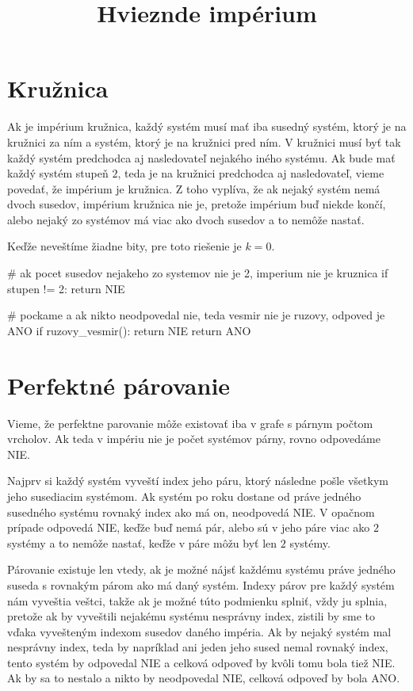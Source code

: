\documentclass[10pt]{article}
\title{\vspace{-3cm}Hvieznde impérium}
\begin{document}
\author{}
\date{}
\maketitle

\section*{Kružnica}

Ak je impérium kružnica, každý systém musí mať iba susedný systém, ktorý je na
kružnici za ním a systém, ktorý je na kružnici pred ním. V kružnici musí byť
tak každý systém predchodca aj nasledovateľ nejakého iného systému. Ak bude mať
každý systém stupeň $2$, teda je na kružnici predchodca aj nasledovateľ, vieme
povedať, že impérium je kružnica. Z toho vyplíva, že ak nejaký systém
nemá dvoch susedov, impérium kružnica nie je, pretože impérium buď niekde
končí, alebo nejaký zo systémov má viac ako dvoch susedov a to nemôže nastať. 

Keďže neveštíme žiadne bity, pre toto riešenie je $k=0$.

\begin{python}
# ak pocet susedov nejakeho zo systemov nie je 2, imperium nie je kruznica
if stupen != 2: return NIE

# pockame a ak nikto neodpovedal nie, teda vesmir nie je ruzovy, odpoved je ANO
if ruzovy_vesmir(): return NIE
return ANO
\end{python}

\section*{Perfektné párovanie}

Vieme, že perfektne parovanie môže existovať iba v grafe s párnym počtom
vrcholov. Ak teda v impériu nie je počet systémov párny, rovno odpovedáme NIE.

Najprv si každý systém vyveští index jeho páru, ktorý následne pošle všetkym
jeho susediacim systémom. Ak systém po roku dostane od práve jedného susedného 
systému rovnaký index ako má on, neodpovedá NIE. V opačnom prípade odpovedá
NIE, keďže buď nemá pár, alebo sú v jeho páre viac ako $2$ systémy a to nemôže
nastať, keďže v páre môžu byť len $2$ systémy.

Párovanie existuje len vtedy, ak je možné nájsť každému systému práve jedného
suseda s rovnakým párom ako má daný systém. Indexy párov pre každý systém
nám vyveštia veštci, takže ak je možné túto podmienku splniť, vždy ju splnia,
pretože ak by vyveštili nejakému systému nesprávny index, zistili by sme to
vďaka vyvešteným indexom susedov daného impéria. Ak by nejaký systém mal
nesprávny index, teda by napríklad ani jeden jeho sused nemal rovnaký index,
tento systém by odpovedal NIE a celková odpoveď by kvôli tomu bola tiež NIE.
Ak by sa to nestalo a nikto by neodpovedal NIE, celková odpoveď by bola ANO.
\end{document}
